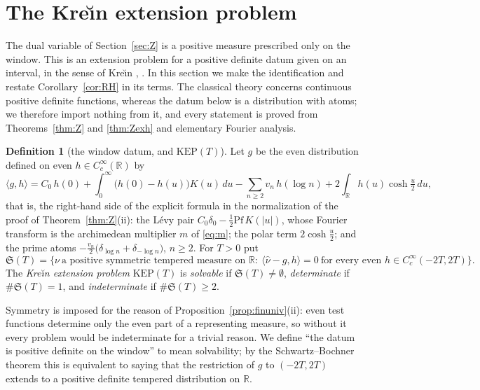 \documentclass[11pt]{amsart}
\theoremstyle{definition}
\newtheorem{definition}[theorem]{Definition}
\theoremstyle{remark}
\newcommand{\R}{\mathbb R}
\newcommand{\nuh}{\widehat\nu}
\begin{document}
\section{The Kre\u{\i}n extension problem}\label{subsec:KEP}

The dual variable of Section~\ref{sec:Z} is a positive measure prescribed only on the window. This
is an extension problem for a positive definite datum given on an interval, in the sense of
Kre\u{\i}n \cite{Krein1940}, \cite[Ch.~2]{Sasvari1994}. In this section we make the identification
and restate Corollary~\ref{cor:RH} in its terms. The classical theory concerns continuous positive
definite functions, whereas the datum below is a distribution with atoms; we therefore import
nothing from it, and every statement is proved from Theorems~\ref{thm:Z} and \ref{thm:Zexh} and
elementary Fourier analysis.

\begin{definition}[the window datum, and $\mathrm{KEP}(T)$]\label{def:KEP}
Let $g$ be the even distribution defined on even $h\in C_c^\infty(\R)$ by
\begin{equation}\label{eq:gdatum}
\langle g,h\rangle=C_0\,h(0)+\int_0^\infty\big(h(0)-h(u)\big)K(u)\,du-\sum_{n\ge2}v_n\,h(\log n)
+2\int_\R h(u)\cosh\tfrac u2\,du,
\end{equation}
that is, the right-hand side of the explicit formula in the normalization of the proof of
Theorem~\ref{thm:Z}(ii): the L\'evy pair $C_0\delta_0-\frac12\mathrm{Pf}\,K(|u|)$, whose Fourier
transform is the archimedean multiplier $m$ of \eqref{eq:m}; the polar term $2\cosh\frac u2$; and
the prime atoms $-\frac{v_n}2\big(\delta_{\log n}+\delta_{-\log n}\big)$, $n\ge2$. For $T>0$ put
\[
\mathfrak S(T)=\Big\{\nu\ \text{a positive symmetric tempered measure on }\R:\
\langle\nuh-g,h\rangle=0\ \text{for every even }h\in C_c^\infty(-2T,2T)\Big\}.
\]
The \emph{Kre\u{\i}n extension problem} $\mathrm{KEP}(T)$ is \emph{solvable} if
$\mathfrak S(T)\ne\emptyset$, \emph{determinate} if $\#\mathfrak S(T)=1$, and \emph{indeterminate}
if $\#\mathfrak S(T)\ge2$.
\end{definition}
Symmetry is imposed for the reason of Proposition~\ref{prop:finuniv}(ii): even test functions
determine only the even part of a representing measure, so without it every problem would be
indeterminate for a trivial reason. We define ``the datum is positive definite on the window'' to
mean solvability; by the Schwartz--Bochner theorem this is equivalent to saying that the restriction
of $g$ to $(-2T,2T)$ extends to a positive definite tempered distribution on $\R$.
\end{document}
